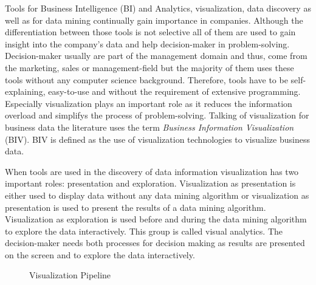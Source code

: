 Tools for Business Intelligence (BI) and Analytics, visualization, data discovery as well as for data mining continually gain importance in companies. Although the differentiation between those tools is not selective all of them are used to gain insight into the company's data and help decision-maker in problem-solving. Decision-maker usually are part of the management domain and thus, come from the marketing, sales or management-field but the majority of them uses these tools without any computer science background. Therefore, tools have to be self-explaining, easy-to-use \cite{Crapo2000} and without the requirement of extensive programming. Especially visualization plays an important role as it reduces the information overload\cite{Keima} and simplifys the process of problem-solving\cite{Zhang}. Talking of visualization for business data the literature uses the term \textit{Business Information Visualization} (BIV). BIV is defined as the use of visualization technologies to visualize business data\cite{Tegarden1999}.    

When tools are used in the discovery of data information visualization has two important roles: presentation and exploration\cite{Crapo2000}. Visualization as presentation is either used to display data without any data mining algorithm or visualization as presentation is used to present the results of a data mining algorithm. Visualization as exploration is used before and during the data mining algorithm to explore the data interactively. This group is called visual analytics. The decision-maker needs both processes for decision making as results are presented on the screen and to explore the data interactively\cite{Ware2012a}. 
\begin{figure}[H]
    \centering
    \caption{Visualization Pipeline \cite{Ware2012a}}
    \label{fig:my_label}
\end{figure}


